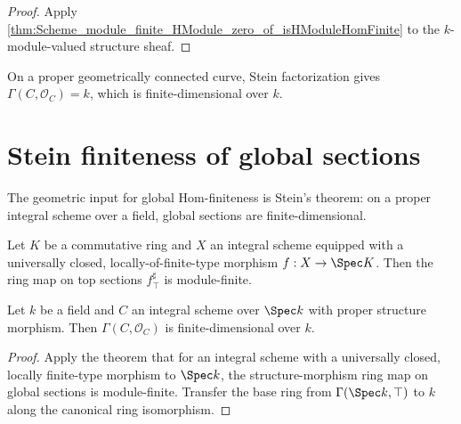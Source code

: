 \begin{proof}
  \leanok
  Apply \cref{thm:Scheme_module_finite_HModule_zero_of_isHModuleHomFinite} to the \(k\)-module-valued structure sheaf.
\end{proof}

\begin{remark}
  On a proper geometrically connected curve, Stein factorization gives \(\Gamma(C, \mathcal O_C) = k\), which is finite-dimensional over \(k\).
\end{remark}

\section{Stein finiteness of global sections}
\label{sec:module_finite_globalSections_iter044}

The geometric input for global Hom-finiteness is Stein's theorem: on a proper integral scheme over a field, global sections are finite-dimensional.

\begin{theorem}
  \label{thm:finite_appTop_of_universallyClosed}

  Let \(K\) be a commutative ring and \(X\) an integral scheme equipped with a
  universally closed, locally-of-finite-type morphism \(f : X \to \Spec K\).
  Then the ring map on top sections \(f^\sharp_{\top}\) is module-finite.

\end{theorem}

\begin{theorem}\leanok
  \label{thm:Scheme_module_finite_globalSections_of_isProper}

  Let \(k\) be a field and \(C\) an integral scheme over \(\Spec k\) with proper structure morphism. Then \(\Gamma(C, \mathcal O_C)\) is finite-dimensional over \(k\).
\end{theorem}

\begin{proof}

  \leanok
  Apply the theorem that for an integral scheme with a universally closed, locally finite-type morphism to \(\Spec k\), the structure-morphism ring map on global sections is module-finite. Transfer the base ring from \(\Gamma(\Spec k, \top)\) to \(k\) along the canonical ring isomorphism.
\end{proof}

